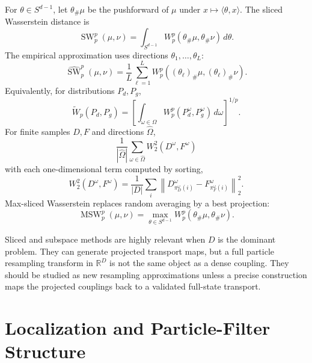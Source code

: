 \documentclass[11pt]{article}
\newcommand{\R}{\mathbb{R}}
\newcommand{\SW}{\operatorname{SW}}
\newcommand{\MSW}{\operatorname{MSW}}
\begin{document}
For $\theta\in S^{d-1}$, let $\theta_{\#}\mu$ be the pushforward of $\mu$
under $x\mapsto\langle\theta,x\rangle$.  The sliced Wasserstein distance is
\begin{equation}
\SW_p^p(\mu,\nu)
=
\int_{S^{d-1}}
W_p^p(\theta_{\#}\mu,\theta_{\#}\nu)\,d\theta.
\label{eq:sliced-wasserstein}
\end{equation}
The empirical approximation uses directions $\theta_1,\ldots,\theta_L$:
\begin{equation}
\widehat{\SW}_p^p(\mu,\nu)
=
\frac{1}{L}\sum_{\ell=1}^L
W_p^p((\theta_\ell)_{\#}\mu,(\theta_\ell)_{\#}\nu).
\label{eq:empirical-sliced}
\end{equation}
Equivalently, for distributions $P_d,P_g$,
\begin{equation}
\widetilde W_p(P_d,P_g)
=
\left[
\int_{\omega\in\Omega}
W_p^p(P_d^\omega,P_g^\omega)\,d\omega
\right]^{1/p}.
\label{eq:deshpande-sw}
\end{equation}
For finite samples $D,F$ and directions $\widehat\Omega$,
\begin{equation}
\frac{1}{|\widehat\Omega|}
\sum_{\omega\in\widehat\Omega}
W_2^2(D^\omega,F^\omega)
\label{eq:finite-sliced}
\end{equation}
with each one-dimensional term computed by sorting,
\begin{equation}
W_2^2(D^\omega,F^\omega)
=
\frac{1}{|D|}\sum_i
\left\|
D^\omega_{\pi_D^\omega(i)}
-F^\omega_{\pi_F^\omega(i)}
\right\|_2^2.
\label{eq:sliced-sorting}
\end{equation}
Max-sliced Wasserstein replaces random averaging by a best projection:
\begin{equation}
\MSW_p^p(\mu,\nu)
=
\max_{\theta\in S^{d-1}}
W_p^p(\theta_{\#}\mu,\theta_{\#}\nu).
\label{eq:max-sliced}
\end{equation}

Sliced and subspace methods are highly relevant when $D$ is the dominant
problem.  They can generate projected transport maps, but a full particle
resampling transform in $\R^D$ is not the same object as a dense coupling.
They should be studied as new resampling approximations unless a precise
construction maps the projected couplings back to a validated full-state
transport.

\section{Localization and Particle-Filter Structure}
\end{document}
